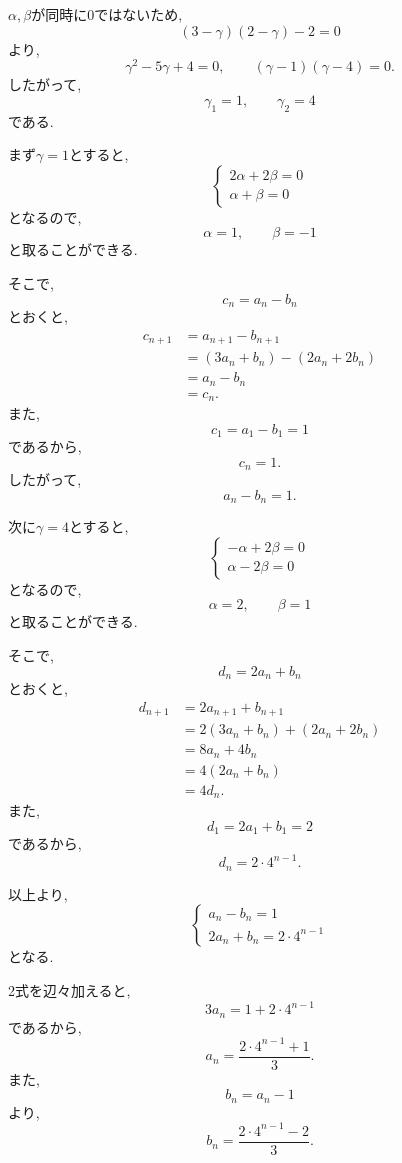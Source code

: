 \begin{enumerate}[label=(\arabic*),parsep=3pt]
        $\alpha,\beta$が同時に$0$ではないため,
        \[
          (3-\gamma)(2-\gamma)-2=0
        \]
        より,
        \[
          \gamma^2-5\gamma+4=0,
          \qquad
          (\gamma-1)(\gamma-4)=0.
        \]
        したがって,
        \[
          \gamma_1=1,\qquad\gamma_2=4
        \]
        である.

        まず$\gamma=1$とすると,
        \[
          \begin{cases}
            2\alpha+2\beta=0 \\
            \alpha+\beta=0
          \end{cases}
        \]
        となるので,
        \[
          \alpha=1,\qquad\beta=-1
        \]
        と取ることができる.

        そこで,
        \[
          c_n=a_n-b_n
        \]
        とおくと,
        \begin{align*}
          c_{n+1}
           & =a_{n+1}-b_{n+1}        \\
           & =(3a_n+b_n)-(2a_n+2b_n) \\
           & =a_n-b_n                \\
           & =c_n.
        \end{align*}
        また,
        \[
          c_1=a_1-b_1=1
        \]
        であるから,
        \[
          c_n=1.
        \]
        したがって,
        \[
          a_n-b_n=1.
        \]

        次に$\gamma=4$とすると,
        \[
          \begin{cases}
            -\alpha+2\beta=0 \\
            \alpha-2\beta=0
          \end{cases}
        \]
        となるので,
        \[
          \alpha=2,\qquad\beta=1
        \]
        と取ることができる.

        そこで,
        \[
          d_n=2a_n+b_n
        \]
        とおくと,
        \begin{align*}
          d_{n+1}
           & =2a_{n+1}+b_{n+1}        \\
           & =2(3a_n+b_n)+(2a_n+2b_n) \\
           & =8a_n+4b_n               \\
           & =4(2a_n+b_n)             \\
           & =4d_n.
        \end{align*}
        また,
        \[
          d_1=2a_1+b_1=2
        \]
        であるから,
        \[
          d_n=2\cdot4^{n-1}.
        \]

        以上より,
        \[
          \begin{cases}
            a_n-b_n=1 \\
            2a_n+b_n=2\cdot4^{n-1}
          \end{cases}
        \]
        となる.

        2式を辺々加えると,
        \[
          3a_n=1+2\cdot4^{n-1}
        \]
        であるから,
        \[
          a_n=\frac{2\cdot4^{n-1}+1}{3}.
        \]
        また,
        \[
          b_n=a_n-1
        \]
        より,
        \[
          b_n=\frac{2\cdot4^{n-1}-2}{3}.
        \]
\end{enumerate}
